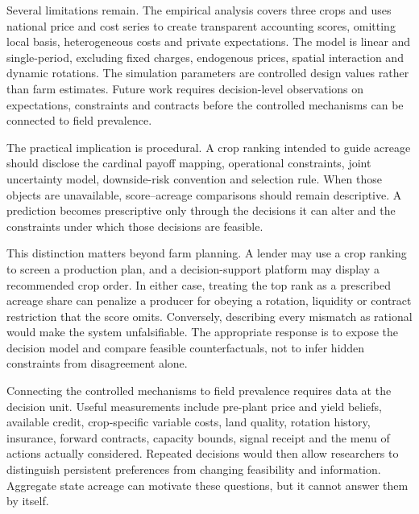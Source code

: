 Several limitations remain. The empirical analysis covers three crops and uses national price and cost series to create transparent accounting scores, omitting local basis, heterogeneous costs and private expectations. The model is linear and single-period, excluding fixed charges, endogenous prices, spatial interaction and dynamic rotations. The simulation parameters are controlled design values rather than farm estimates. Future work requires decision-level observations on expectations, constraints and contracts before the controlled mechanisms can be connected to field prevalence.

The practical implication is procedural. A crop ranking intended to guide acreage should disclose the cardinal payoff mapping, operational constraints, joint uncertainty model, downside-risk convention and selection rule. When those objects are unavailable, score--acreage comparisons should remain descriptive. A prediction becomes prescriptive only through the decisions it can alter and the constraints under which those decisions are feasible.

This distinction matters beyond farm planning. A lender may use a crop ranking to screen a production plan, and a decision-support platform may display a recommended crop order. In either case, treating the top rank as a prescribed acreage share can penalize a producer for obeying a rotation, liquidity or contract restriction that the score omits. Conversely, describing every mismatch as rational would make the system unfalsifiable. The appropriate response is to expose the decision model and compare feasible counterfactuals, not to infer hidden constraints from disagreement alone.

Connecting the controlled mechanisms to field prevalence requires data at the decision unit. Useful measurements include pre-plant price and yield beliefs, available credit, crop-specific variable costs, land quality, rotation history, insurance, forward contracts, capacity bounds, signal receipt and the menu of actions actually considered. Repeated decisions would then allow researchers to distinguish persistent preferences from changing feasibility and information. Aggregate state acreage can motivate these questions, but it cannot answer them by itself.
